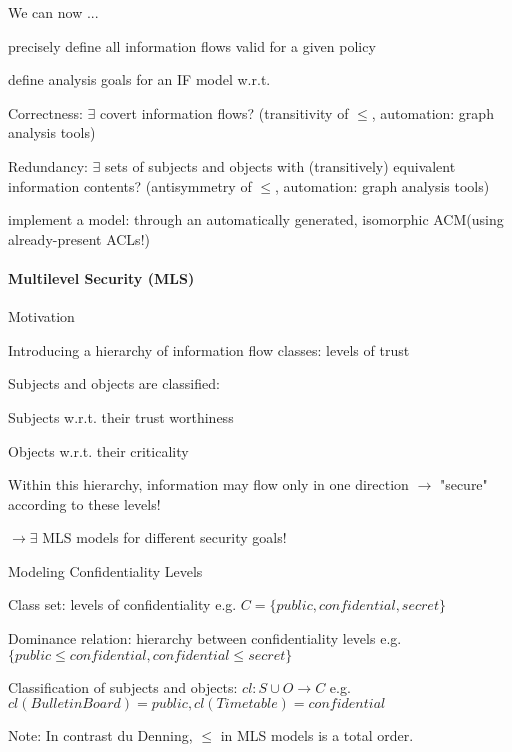 \documentclass[a4paper]{article}
\begin{document}
\begin{multicols}{3}
    We can now ...
    \begin{itemize*}
        \item precisely define all information flows valid for a given policy
        \item define analysis goals for an IF model w.r.t.
              \begin{itemize*}
                  \item Correctness: $\exists$ covert information flows? (transitivity of $\leq$, automation: graph analysis tools)
                  \item Redundancy: $\exists$ sets of subjects and objects with (transitively) equivalent information contents? (antisymmetry of $\leq$, automation: graph analysis tools)
              \end{itemize*}
        \item implement a model: through an automatically generated, isomorphic ACM(using already-present ACLs!)
    \end{itemize*}


    \paragraph{Multilevel Security (MLS)}
    Motivation
    \begin{itemize*}
        \item Introducing a hierarchy of information flow classes: levels of trust
        \item Subjects and objects are classified:
              \begin{itemize*}
                  \item Subjects w.r.t. their trust worthiness
                  \item Objects w.r.t. their criticality
              \end{itemize*}
        \item Within this hierarchy, information may flow only in one direction $\rightarrow$ "secure" according to these levels!
        \item $\rightarrow \exists$ MLS models for different security goals!
    \end{itemize*}

    Modeling Confidentiality Levels
    \begin{itemize*}
        \item Class set: levels of confidentiality e.g. $C=\{public,confidential,secret\}$
        \item Dominance relation: hierarchy between confidentiality levels e.g. $\{public \leq confidential,confidential \leq secret\}$
        \item Classification of subjects and objects: $cl:S\cup O\rightarrow C$ e.g. $cl(BulletinBoard)=public,cl(Timetable)=confidential$
        \item Note: In contrast du Denning, $\leq$ in MLS models is a total order.
    \end{itemize*}


\end{multicols}
\end{document}
